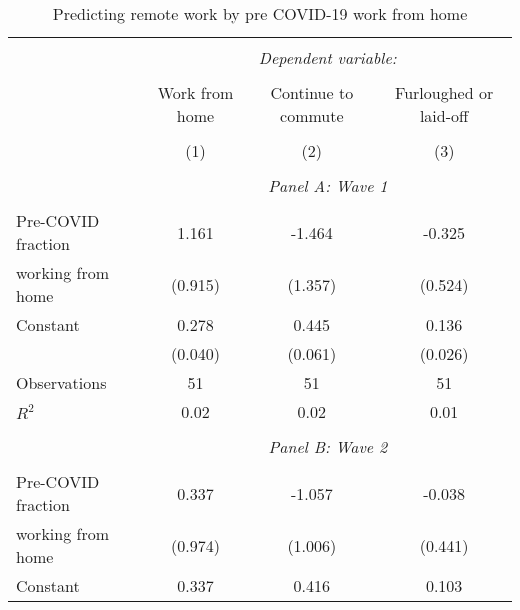 \begin{table}[!htbp] \centering                    \caption{Predicting remote work by pre COVID-19 work from home}                    \label{tab:priorremotework}                  \small                  \begin{tabular}{@{\extracolsep{5pt}}lccc}                  \\[-1.8ex]\hline                  \hline \\[-1.8ex]                   & \multicolumn{3}{c}{\textit{Dependent variable:}} \\                   \cline{2-4}                   \\[-1.8ex] & Work from home & Continue to commute & Furloughed or laid-off \\                   \hline \\[-1.8ex]               
                    &\multicolumn{1}{c}{(1)}         &\multicolumn{1}{c}{(2)}         &\multicolumn{1}{c}{(3)}         \\
\hline \\               & \multicolumn{3}{c}{\textit{Panel A: Wave 1}} \\               \addlinespace[1mm] \\
Pre-COVID fraction  &       1.161         &      -1.464         &      -0.325         \\
working from home   &     (0.915)         &     (1.357)         &     (0.524)         \\
[1em]
Constant            &       0.278\sym{***}&       0.445\sym{***}&       0.136\sym{***}\\
                    &     (0.040)         &     (0.061)         &     (0.026)         \\
[1em]
Observations        &          51         &          51         &          51         \\
\(R^{2}\)           &        0.02         &        0.02         &        0.01         \\
\hline \\               & \multicolumn{3}{c}{\textit{Panel B: Wave 2}} \\               \addlinespace[1mm] \\
Pre-COVID fraction  &       0.337         &      -1.057         &      -0.038         \\
working from home   &     (0.974)         &     (1.006)         &     (0.441)         \\
[1em]
Constant            &       0.337\sym{***}&       0.416\sym{***}&       0.103\sym{***}\\

\end{tabular}
\end{table}
